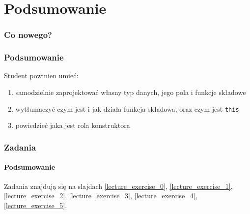\documentclass[aspectratio=169]{beamer}
\begin{document}

\section{Podsumowanie}

\begin{frame}
    \frametitle{Co nowego?}
    \frametitle{Podsumowanie}

    Student powinien umieć:

    \begin{enumerate}
        \item samodzielnie zaprojektować własny typ danych, jego pola i funkcje
            składowe
        \item wytłumaczyć czym jest i jak działa funkcja składowa, oraz czym
            jest {\tt this}
        \item powiedzieć jaka jest rola konstruktora
    \end{enumerate}
\end{frame}

\begin{frame}
    \frametitle{Zadania}
    \framesubtitle{Podsumowanie}

    Zadania znajdują się na slajdach
    \ref{lecture_exercise_0},
    \ref{lecture_exercise_1},
    \ref{lecture_exercise_2},
    \ref{lecture_exercise_3},
    \ref{lecture_exercise_4},
    \ref{lecture_exercise_5}.
\end{frame}
\end{document}
